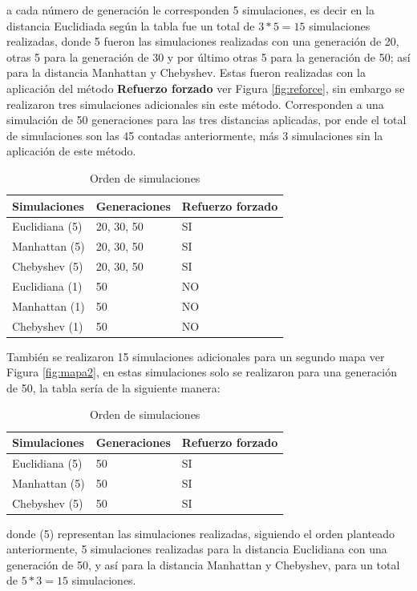 \documentclass[conference]{IEEEtran}
\begin{document}
a cada número de generación le corresponden 5 simulaciones, es decir en la distancia Euclidiada según la tabla fue un total de $3*5 = 15$ simulaciones realizadas, donde 5 fueron las simulaciones realizadas con una generación de 20, otras 5 para la generación de 30 y por último otras 5 para la generación de 50; así para la distancia Manhattan y Chebyshev. Estas fueron realizadas con la aplicación del método \textbf{Refuerzo forzado} ver Figura \ref{fig:reforce}, sin embargo se realizaron tres simulaciones adicionales sin este método. Corresponden a una simulación de 50 generaciones para las tres distancias aplicadas, por ende el total de simulaciones son las 45 contadas anteriormente, más 3 simulaciones sin la aplicación de este método.
\begin{table}[H]
\centering
\caption{Orden de simulaciones}
\label{tab:fds_1}
\begin{tabular}{lll}
\toprule
\textbf{Simulaciones} & 
\textbf{Generaciones}  &
\textbf{Refuerzo forzado}\\
\midrule
Euclidiana (5)   &  20, 30, 50 & SI\\
Manhattan (5)     &  20, 30, 50 & SI\\
Chebyshev (5)     &  20, 30, 50 & SI\\
\bottomrule
Euclidiana (1)    & 50 & NO\\
Manhattan (1)     & 50 & NO\\
Chebyshev  (1)    & 50 & NO\\
\bottomrule
\end{tabular}
\end{table}

También se realizaron 15 simulaciones adicionales para un segundo mapa ver Figura \ref{fig:mapa2}, en estas simulaciones solo se realizaron para una generación de 50, la tabla sería de la siguiente manera:
\begin{table}[H]
\centering
\caption{Orden de simulaciones}
\label{tab:fds_2}
\begin{tabular}{lll}
\toprule
\textbf{Simulaciones} & 
\textbf{Generaciones}  &
\textbf{Refuerzo forzado}\\
\midrule
Euclidiana (5)   &50 & SI\\
Manhattan (5)     &50 & SI\\
Chebyshev (5)     &50 & SI\\
\bottomrule
\end{tabular}
\end{table}
donde (5) representan las simulaciones realizadas, siguiendo el orden planteado anteriormente, 5 simulaciones realizadas para la distancia Euclidiana con una generación de 50, y así para la distancia Manhattan y Chebyshev, para un total de $5*3=15$ simulaciones.
\end{document}
